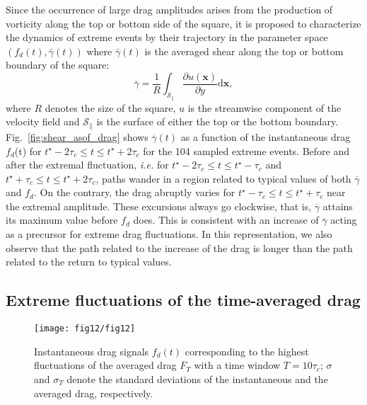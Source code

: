 Since the occurrence of large drag amplitudes arises from the production of vorticity along the top or bottom side of the square, it is proposed to characterize the dynamics of extreme events by their trajectory in the parameter space $(f_d(t), \bar{\gamma}(t))$ where $\bar{\gamma}(t)$ is the averaged shear along the top or bottom boundary of the square:
\begin{equation}
\label{eq:avg_shear_def}
\overline{\gamma} = \frac{1}{R} \int_{\mathcal{S}_\parallel} \frac{\partial u(\mathbf{x})}{\partial y}\mathrm{d}\mathbf{x},
\end{equation}
where $R$ denotes the size of the square, $u$ is the streamwise component of the velocity field and $\mathcal{S}_\parallel$ is the surface of either the top or the bottom boundary.
%
Fig.~\ref{fig:shear_asof_drag} shows $\overline{\gamma}(t)$ as a function of the instantaneous drag $f_d$(t) for $t^{\star}-2\tau_c \leq t \leq  t^{\star}+2\tau_c$ for the 104 sampled extreme events.
Before and after the extremal fluctuation, \textit{i.e.} for $t^{\star}-2\tau_c \leq t \leq t^{\star}-\tau_c$ and $t^{\star}+\tau_c \leq t \leq t^{\star}+2\tau_c$, paths wander in a region related to typical values of both $\overline{\gamma}$ and $f_d$.
On the contrary, the drag abruptly varies for $t^{\star}-\tau_c \leq t \leq t^{\star}+\tau_c$ near the extremal amplitude.
These excursions always go clockwise, that is, $\overline{\gamma}$ attains its maximum value before $f_d$ does. 
This is consistent with an increase of $\overline{\gamma}$ acting as a precursor for extreme drag fluctuations.
In this representation, we also observe that the path related to the increase of the drag is longer than the path related to the return to typical values. 

\subsection{Extreme fluctuations of the time-averaged drag }
\label{sec:time_avg}

\begin{figure}
	\centering
	\texttt{[image: fig12/fig12]}
	\caption{Instantaneous drag signals $f_d(t)$ corresponding to the highest fluctuations of the averaged  drag $F_T$ with a time window $T = 10 \tau_c$;  $\sigma$ and $\sigma_T$ denote the standard deviations of the instantaneous and the averaged drag, respectively.}
	\label{fig:extreme_avg}
\end{figure}

